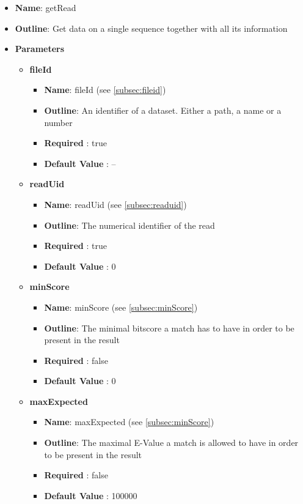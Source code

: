 \documentclass[11pt]{article}
\begin{document}
\begin{itemize}
	\item \textbf{Name}: getRead
	\item \textbf{Outline}: Get data on a single sequence together with all its information
	\item \textbf{Parameters}
		\begin{itemize}
			\item \textbf{fileId}
				\begin{itemize}
					\item \textbf{Name}: fileId (see \ref{subsec:fileid})
					\item \textbf{Outline}: An identifier of a dataset. Either a path, a name or a number
					\item \textbf{Required} : true
					\item \textbf{Default Value} : --
				\end{itemize}
			\item \textbf{readUid}
				\begin{itemize}
					\item \textbf{Name}: readUid (see \ref{subsec:readuid})
					\item \textbf{Outline}: The numerical identifier of the read
					\item \textbf{Required} : true
					\item \textbf{Default Value} : 0
				\end{itemize}
			\item \textbf{minScore}
				\begin{itemize}
					\item \textbf{Name}: minScore (see \ref{subsec:minScore})
					\item \textbf{Outline}: The minimal bitscore a match has to have in order to be present in the result
					\item \textbf{Required} : false
					\item \textbf{Default Value} : 0
				\end{itemize}
			\item \textbf{maxExpected}
				\begin{itemize}
					\item \textbf{Name}: maxExpected (see \ref{subsec:minScore})
					\item \textbf{Outline}: The maximal E-Value a match is allowed to have in order to be present in the result
					\item \textbf{Required} : false
					\item \textbf{Default Value} : 100000

\end{itemize}
\end{itemize}
\end{itemize}
\end{document}
